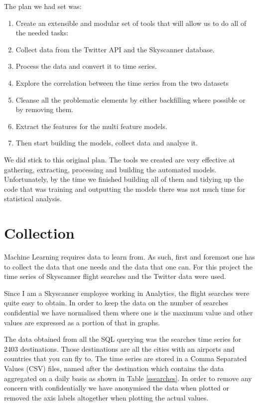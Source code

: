 \documentclass[minf,twoside,singlespacing,parskip,notimes,deptreport]{infthesis} %
\begin{document}
The plan we had set was:
\begin{enumerate}
\item Create an extensible and modular set of tools that will allow us to do all of the needed tasks:
\item Collect data from the Twitter API and the Skyscanner database. 
\item Process the data and convert it to time series.
\item Explore the correlation between the time series from the two datasets
\item Cleanse all the problematic elements by either backfilling where possible or by removing them.
\item Extract the features for the multi feature models.
\item Then start building the models, collect data and analyse it. 
\end{enumerate}


We did stick to this original plan. The tools\cite{code} we created are very effective at gathering, extracting, processing and building the automated models. Unfortunately, by the time we finished building all of them and tidying up the code that was training and outputting the models there was not much time for statistical analysis. 

\section{Collection}

Machine Learning requires data to learn from. As such, first and foremost one has to collect the data that one needs and the data that one can. For this project the time series of Skyscanner flight searches and the Twitter data were used.

Since I am a Skyscanner employee working in Analytics, the flight searches were quite easy to obtain. In order to keep the data on the number of searches confidential we have normalised them where one is the maximum value and other values are expressed as a portion of that in graphs.


The data obtained from all the SQL querying was the searches time series for 2403 destinations. Those destinations are all the cities with an airports and countries that you can fly to. The time series are stored in a Comma Separated Values (CSV) files, named after the destination which contains the data aggregated on a daily basis as shown in Table \ref{ssearches}. In order to remove any concern with confidentially we have anonymised the data when plotted or removed the axis labels altogether when plotting the actual values.
\end{document}
